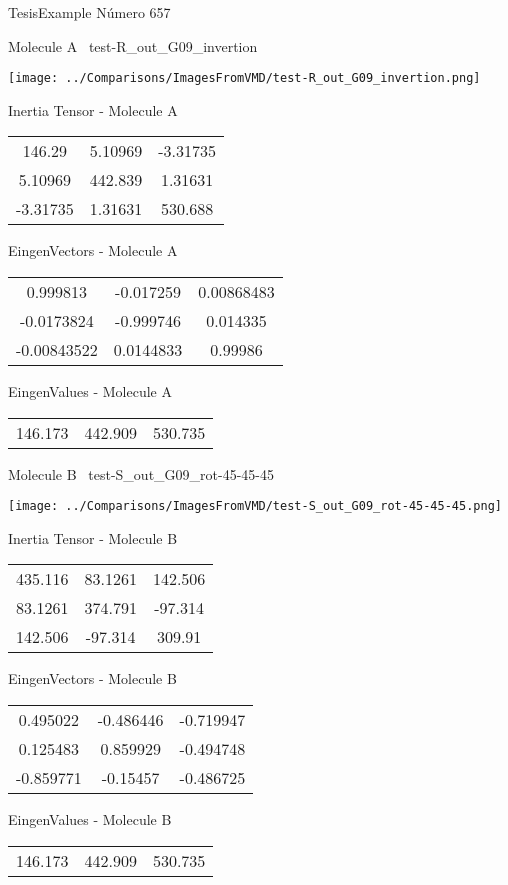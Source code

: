 \vtab[-3cm]
\begin{center}
{\large TesisExample \tab Número 657}
\end{center}
\begin{multicols}{2}
\begin{center}

Molecule A \
test-R\_out\_G09\_invertion

\texttt{[image: ../Comparisons/ImagesFromVMD/test-R\_out\_G09\_invertion.png]}

Inertia Tensor - Molecule A \\
\begin{tabular}{|c c c|}
146.29	 & 	5.10969	 & 	-3.31735	 \\
5.10969	 & 	442.839	 & 	1.31631	 \\
-3.31735	 & 	1.31631	 & 	530.688
\end{tabular}

\vtab
 EingenVectors - Molecule A     \\
\begin{tabular}{|c c c|}
0.999813	 & 	-0.017259	 & 	0.00868483	 \\
-0.0173824	 & 	-0.999746	 & 	0.014335	 \\
-0.00843522	 & 	0.0144833	 & 	0.99986
\end{tabular}

\vtab
 EingenValues - Molecule A     \\
\begin{tabular}{|c c c|}
146.173	 & 	442.909	 & 	530.735	 \\
\end{tabular}
\columnbreak

Molecule B \
test-S\_out\_G09\_rot-45-45-45

\texttt{[image: ../Comparisons/ImagesFromVMD/test-S\_out\_G09\_rot-45-45-45.png]}

Inertia Tensor - Molecule B \\
\begin{tabular}{|c c c|}
435.116	 & 	83.1261	 & 	142.506	 \\
83.1261	 & 	374.791	 & 	-97.314	 \\
142.506	 & 	-97.314	 & 	309.91
\end{tabular}

\vtab
 EingenVectors - Molecule B     \\
\begin{tabular}{|c c c|}
0.495022	 & 	-0.486446	 & 	-0.719947	 \\
0.125483	 & 	0.859929	 & 	-0.494748	 \\
-0.859771	 & 	-0.15457	 & 	-0.486725
\end{tabular}

\vtab
 EingenValues - Molecule B     \\
\begin{tabular}{|c c c|}
146.173	 & 	442.909	 & 	530.735	 \\
\end{tabular}

\end{center}
\end{multicols}

